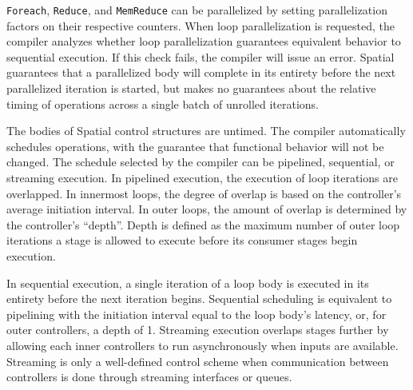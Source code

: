 \texttt{\small{Foreach}}, \texttt{\small{Reduce}}, and \texttt{\small{MemReduce}} can be parallelized by setting parallelization factors on their respective counters.
When loop parallelization is requested, the compiler analyzes whether
loop parallelization guarantees equivalent behavior to sequential execution.
If this check fails, the compiler will issue an error.
Spatial guarantees that a parallelized body will complete in its entirety before the next parallelized iteration is started, but makes no guarantees about the relative timing of operations across a single batch of unrolled iterations.

The bodies of Spatial control structures are untimed. The compiler automatically schedules operations, with the guarantee that functional behavior will not be changed.
The schedule selected by the compiler can be pipelined, sequential, or streaming execution. In pipelined execution, the execution of loop iterations are overlapped.
In innermost loops, the degree of overlap is based on the controller's average initiation interval.
In outer loops, the amount of overlap is determined by the controller's ``depth''. Depth is defined as the maximum number of outer loop iterations a stage is allowed to execute before its consumer stages begin execution.

In sequential execution, a single iteration of a loop body is executed in its entirety before the next iteration begins.
Sequential scheduling is equivalent to pipelining with the initiation interval equal to the loop body's latency, or, for outer controllers, a depth of 1. Streaming execution overlaps stages further by allowing each inner controllers to run asynchronously when inputs are available.
Streaming is only a well-defined control scheme when communication between controllers is done through streaming interfaces or queues.


